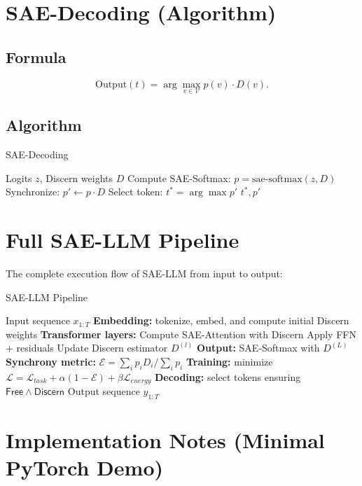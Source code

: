 \documentclass[11pt]{article}
\theoremstyle{plain}
\theoremstyle{definition}
\theoremstyle{remark}
\newcommand{\Discern}{\ensuremath{\mathsf{Discern}}}
\newcommand{\Free}{\ensuremath{\mathsf{Free}}}
\begin{document}
\section{SAE-Decoding (Algorithm)}

\subsection{Formula}
\[
\text{Output}(t) = \arg\max_{v \in \mathcal{V}} p(v) \cdot D(v).
\]

\subsection{Algorithm}

\begin{algorithm}[h]
\caption{SAE-Decoding}
\begin{algorithmic}[1]
\REQUIRE Logits $z$, Discern weights $D$
\STATE Compute SAE-Softmax: $p = \text{sae-softmax}(z,D)$
\STATE Synchronize: $p' \gets p \cdot D$
\STATE Select token: $t^* = \arg\max p'$
\RETURN $t^*, p'$
\end{algorithmic}
\end{algorithm}

\section{Full SAE-LLM Pipeline}

The complete execution flow of SAE-LLM from input to output:

\begin{algorithm}[h]
\caption{SAE-LLM Pipeline}
\begin{algorithmic}[1]
\REQUIRE Input sequence $x_{1:T}$
\STATE \textbf{Embedding:} tokenize, embed, and compute initial Discern weights
\STATE \textbf{Transformer layers:}
    \STATE Compute SAE-Attention with Discern
    \STATE Apply FFN + residuals
    \STATE Update Discern estimator $D^{(l)}$
  \ENDFOR
\STATE \textbf{Output:} SAE-Softmax with $D^{(L)}$
\STATE \textbf{Synchrony metric:} $\mathcal{E} = \sum_i p_i D_i / \sum_i p_i$
\STATE \textbf{Training:} minimize $\mathcal{L} = \mathcal{L}_{task} + \alpha (1-\mathcal{E}) + \beta \mathcal{L}_{energy}$
\STATE \textbf{Decoding:} select tokens ensuring $\Free \wedge \Discern$
\RETURN Output sequence $\hat{y}_{1:T}$
\end{algorithmic}
\end{algorithm}

\section{Implementation Notes (Minimal PyTorch Demo)}
\end{document}

